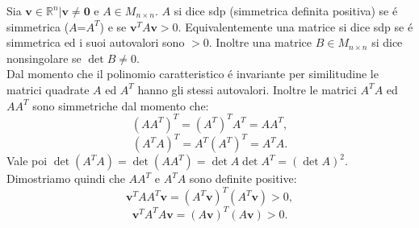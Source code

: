 Sia $\mathbf{v} \in \mathbb{R}^n| \mathbf{v} \neq \mathbf{0}$ e $A \in M_{n \times n}$.
$A$ si dice sdp (simmetrica definita positiva) se \'e simmetrica ($A$=$A^T$) e se $\mathbf{v}^TA\mathbf{v} > 0.$
Equivalentemente una matrice si dice sdp se \'e simmetrica ed i suoi autovalori sono $> 0.$
Inoltre una matrice $B \in M_{n \times n}$ si dice nonsingolare se $\det{B} \neq 0.$
\\
Dal momento che il polinomio caratteristico \'e invariante per similitudine le matrici quadrate $A$ ed $A^T$ hanno gli stessi autovalori.
Inoltre le matrici $A^TA$ ed $AA^T$ sono simmetriche dal momento che:
\[
(AA^T)^T = (A^T)^TA^T = AA^T ,\]
\[
(A^TA)^T = A^T(A^T)^T = A^TA.
\]
Vale poi $\det{(A^TA)} = \det{(AA^T)} = \det{A}\det{A^T} = (\det{A})^2.$
\\
Dimostriamo quindi che $AA^T$ e $A^TA$ sono definite positive:
\[
\mathbf{v}^TAA^T\mathbf{v} = (A^T\mathbf{v})^T(A^T\mathbf{v}) > 0, \]
\[
\mathbf{v}^TA^TA\mathbf{v} = (A\mathbf{v})^T(A\mathbf{v}) > 0.
\]
